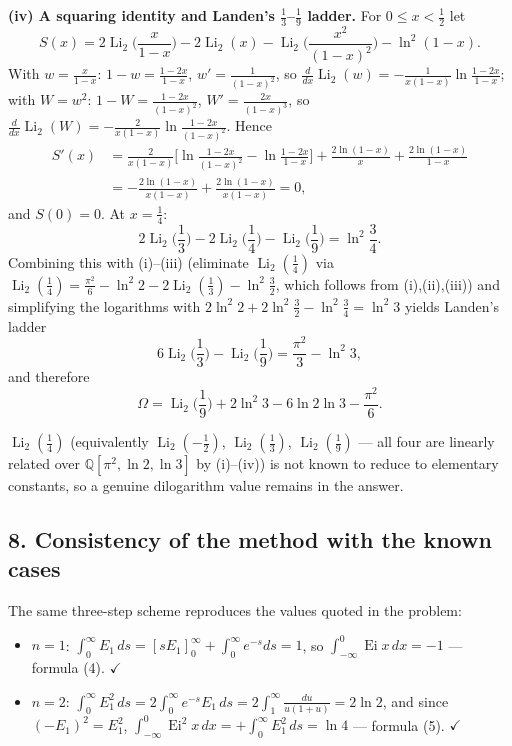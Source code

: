 \documentclass[11pt]{article}
\theoremstyle{remark}
\begin{document}
\textbf{(iv) A squaring identity and Landen's $\tfrac13$--$\tfrac19$ ladder.} For $0\le x<\tfrac12$ let
$$S(x)=2\operatorname{Li}_{2}\!\Big(\frac{x}{1-x}\Big)-2\operatorname{Li}_{2}(x)-\operatorname{Li}_{2}\!\Big(\frac{x^{2}}{(1-x)^{2}}\Big)-\ln^{2}(1-x).$$
With $w=\frac{x}{1-x}$: $1-w=\frac{1-2x}{1-x}$, $w'=\frac{1}{(1-x)^{2}}$, so $\frac{d}{dx}\operatorname{Li}_2(w)=-\frac{1}{x(1-x)}\ln\frac{1-2x}{1-x}$; with $W=w^{2}$: $1-W=\frac{1-2x}{(1-x)^{2}}$, $W'=\frac{2x}{(1-x)^{3}}$, so $\frac{d}{dx}\operatorname{Li}_2(W)=-\frac{2}{x(1-x)}\ln\frac{1-2x}{(1-x)^{2}}$. Hence
$$\begin{aligned}
S'(x)&=\frac{2}{x(1-x)}\Big[\ln\frac{1-2x}{(1-x)^{2}}-\ln\frac{1-2x}{1-x}\Big]
+\frac{2\ln(1-x)}{x}+\frac{2\ln(1-x)}{1-x}\\
&=-\frac{2\ln(1-x)}{x(1-x)}+\frac{2\ln(1-x)}{x(1-x)}=0,
\end{aligned}$$
and $S(0)=0$. At $x=\tfrac14$:
$$2\operatorname{Li}_{2}\!\Big(\frac13\Big)-2\operatorname{Li}_{2}\!\Big(\frac14\Big)-\operatorname{Li}_{2}\!\Big(\frac19\Big)=\ln^{2}\frac34 .$$
Combining this with (i)--(iii) (eliminate $\operatorname{Li}_2(\tfrac14)$ via $\operatorname{Li}_{2}(\tfrac14)=\frac{\pi^{2}}{6}-\ln^{2}2-2\operatorname{Li}_{2}(\tfrac13)-\ln^{2}\frac32$, which follows from (i),(ii),(iii)) and simplifying the logarithms with $2\ln^{2}2+2\ln^{2}\frac32-\ln^{2}\frac34=\ln^{2}3$ yields Landen's ladder
$$6\operatorname{Li}_{2}\!\Big(\frac13\Big)-\operatorname{Li}_{2}\!\Big(\frac19\Big)=\frac{\pi^{2}}{3}-\ln^{2}3 ,$$
and therefore
$$\Omega=\operatorname{Li}_{2}\!\Big(\frac19\Big)+2\ln^{2}3-6\ln2\ln3-\frac{\pi^{2}}{6}.$$

\begin{sloppypar}
$\operatorname{Li}_2(\tfrac14)$ (equivalently $\operatorname{Li}_2(-\tfrac12)$, $\operatorname{Li}_2(\tfrac13)$, $\operatorname{Li}_2(\tfrac19)$ --- all four are linearly related over $\mathbb{Q}[\pi^2,\ln 2,\ln 3]$ by (i)--(iv)) is not known to reduce to elementary constants, so a genuine dilogarithm value remains in the answer.
\end{sloppypar}

\subsection*{8. Consistency of the method with the known cases}

The same three-step scheme reproduces the values quoted in the problem:

\begin{itemize}
\item $n=1$: $\int_{0}^{\infty}E_1\,ds=[sE_1]_0^\infty+\int_0^\infty e^{-s}ds=1$, so $\int_{-\infty}^{0}\operatorname{Ei}x\,dx=-1$ --- formula (4). $\checkmark$
\item $n=2$: $\int_{0}^{\infty}E_1^{2}\,ds=2\int_{0}^{\infty}e^{-s}E_1\,ds
 =2\int_{1}^{\infty}\frac{du}{u(1+u)}=2\ln 2$, and since $(-E_1)^2=E_1^2$,
 $\int_{-\infty}^{0}\operatorname{Ei}^{2}x\,dx=+\int_0^\infty E_1^2\,ds=\ln 4$ --- formula (5). $\checkmark$
\end{itemize}
\end{document}
